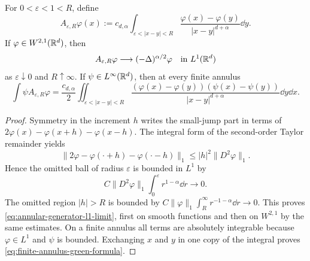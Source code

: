 \begin{lemma}
\label{lem:annular-fractional-green-closure}
For \(0<\varepsilon<1<R\), define
\[
 A_{\varepsilon,R}\varphi(x)
 :=c_{d,\alpha}\int_{\varepsilon<|x-y|<R}
 \frac{\varphi(x)-\varphi(y)}{|x-y|^{d+\alpha}}\dd y.
\]
If \(\varphi\in W^{2,1}(\mathbb{R}^d)\), then
\begin{equation}\label{eq:annular-generator-l1-limit}
 A_{\varepsilon,R}\varphi\longrightarrow
 (-\Delta)^{\alpha/2}\varphi
 \quad\hbox{in }L^1(\mathbb{R}^d)
\end{equation}
as \(\varepsilon\downarrow0\) and \(R\uparrow\infty\).  If
\(\psi\in L^\infty(\mathbb{R}^d)\), then at every finite annulus
\begin{equation}\label{eq:finite-annulus-green-formula}
 \int\psi A_{\varepsilon,R}\varphi
 =\frac{c_{d,\alpha}}2
 \iint_{\varepsilon<|x-y|<R}
 \frac{(\varphi(x)-\varphi(y))(\psi(x)-\psi(y))}
 {|x-y|^{d+\alpha}}\dd y\dd x.
\end{equation}
\end{lemma}

\begin{proof}
Symmetry in the increment \(h\) writes the small-jump part in terms of
\(2\varphi(x)-\varphi(x+h)-\varphi(x-h)\).  The integral form of the
second-order Taylor remainder yields
\[
 \|2\varphi-\varphi(\mathord\cdot+h)
 -\varphi(\mathord\cdot-h)\|_1
 \le |h|^2\|D^2\varphi\|_1.
\]
Hence the omitted ball of radius \(\varepsilon\) is bounded in \(L^1\) by
\[
 C\|D^2\varphi\|_1\int_0^\varepsilon r^{1-\alpha}\dd r
 \longrightarrow0.
\]
The omitted region \(|h|>R\) is bounded by
\(C\|\varphi\|_1\int_R^\infty r^{-1-\alpha}\dd r\to0\).
This proves \eqref{eq:annular-generator-l1-limit}, first on smooth
functions and then on \(W^{2,1}\) by the same estimates.  On a finite
annulus all terms are absolutely integrable because \(\varphi\in L^1\) and
\(\psi\) is bounded.  Exchanging \(x\) and \(y\) in one copy of the
integral proves \eqref{eq:finite-annulus-green-formula}.
\end{proof}

